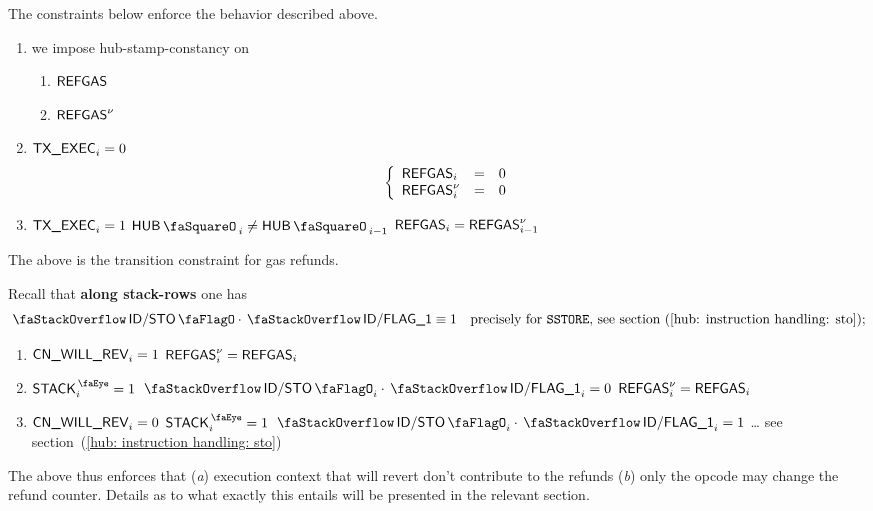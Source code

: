 The constraints below enforce the behavior described above.
\begin{enumerate}
        \item we impose hub-stamp-constancy on
		\begin{multicols}{2}
			\begin{enumerate}
				\item $\textsf{REFGAS}$
				\item $\textsf{REFGAS}^{\nu}$
			\end{enumerate}
		\end{multicols}
	\item \If $\textsf{TX}\textsf{\_EXEC}_{i} = 0$ \Then
		\[
			\left\{ \begin{array}{lcl}
				\textsf{REFGAS}_{i}     & = & 0 \\
				\textsf{REFGAS}^{\nu}_{i} & = & 0 \\
			\end{array} \right.
		\]
	\item \If $\textsf{TX}\textsf{\_EXEC}_{i} = 1$ \et $\hubStamp_{i} \neq \hubStamp_{i - 1}$ \Then $\textsf{REFGAS}_{i} = \textsf{REFGAS}^{\nu}_{i - 1}$
\end{enumerate}
The above is the transition constraint for gas refunds.

Recall that \textbf{along stack-rows} one has
\[
		\stackDecStoFlag \cdot \decFlag{1} \equiv 1  \quad \text{precisely for \inst{SSTORE}, see section~(\ref{hub: instruction handling: sto});}
\]
\begin{enumerate}[resume]
	\item \If $\textsf{CN}\textsf{\_WILL\_REV}_{i} = 1$
		\Then $\textsf{REFGAS}^{\nu}_{i} = \textsf{REFGAS}_{i}$
	\item \If $\peekStack_{i} = 1$ \et $\stackDecStoFlag  _{i} \cdot \decFlag{1}_{i} = 0$
		\Then $\textsf{REFGAS}^{\nu}_{i} = \textsf{REFGAS}_{i}$
	\item \If $\textsf{CN}\textsf{\_WILL\_REV}_{i} = 0$ \et $\peekStack_{i} = 1$ \If $\stackDecStoFlag_{i} \cdot \decFlag{1}_{i}  = 1$ \Then \dots{} see section~(\ref{hub: instruction handling: sto})
\end{enumerate}
The above thus enforces that
(\emph{a}) execution context that will revert don't contribute to the refunds
(\emph{b}) only the  opcode may change the refund counter.
Details as to what exactly this entails will be presented in the relevant section.
